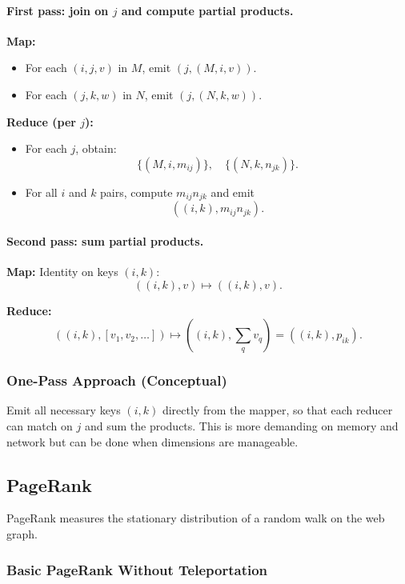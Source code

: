 \documentclass[11pt]{article}
\begin{document}
\paragraph{First pass: join on $j$ and compute partial products.}

\textbf{Map:}
\begin{itemize}
    \item For each $(i,j,v)$ in $M$, emit $(j, (M, i, v))$.
    \item For each $(j,k,w)$ in $N$, emit $(j, (N, k, w))$.
\end{itemize}

\textbf{Reduce (per $j$):}
\begin{itemize}
    \item For each $j$, obtain:
    \[
        \{(M, i, m_{ij})\},\quad \{(N, k, n_{jk})\}.
    \]
    \item For all $i$ and $k$ pairs, compute $m_{ij}n_{jk}$ and emit
    \[
        ((i,k), m_{ij}n_{jk}).
    \]
\end{itemize}

\paragraph{Second pass: sum partial products.}

\textbf{Map:} Identity on keys $(i,k)$:
\[
    ((i,k), v) \mapsto ((i,k), v).
\]

\textbf{Reduce:}
\[
    ((i,k), [v_1, v_2, \dots]) \mapsto ((i,k), \sum_q v_q) = ((i,k), p_{ik}).
\]

\subsubsection*{One-Pass Approach (Conceptual)}

Emit all necessary keys $(i,k)$ directly from the mapper, so that each reducer can match on $j$ and sum the products. This is more demanding on memory and network but can be done when dimensions are manageable.

\subsection{PageRank}

PageRank measures the stationary distribution of a random walk on the web graph.

\subsubsection*{Basic PageRank Without Teleportation}
\end{document}
